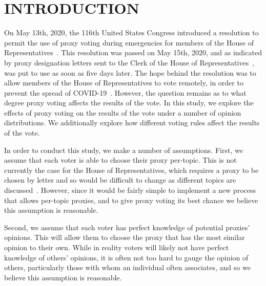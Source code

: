 %
%

\chapter{INTRODUCTION}\label{ch:introduction}
\thispagestyle{empty}

On May 13th, 2020, the 116th United States Congress introduced a resolution
to permit the use of proxy voting during emergencies for members of the House of
Representatives~\cite{Congress.gov2020}.
This resolution was passed on May 15th, 2020, and as indicated by proxy designation
letters sent to the Clerk of the House of Representatives~\cite{Clerk.House.gov2022},
was put to use as soon as five days later.
The hope behind the resolution was to allow members of the House of Representatives
to vote remotely, in order to prevent the spread of COVID-19~\cite{Congress.gov2020}.
However, the question remains as to what degree proxy voting affects the results of
the vote.
In this study, we explore the effects of proxy voting on the results of the vote
under a number of opinion distributions.
We additionally explore how different voting rules affect the results of the vote.


In order to conduct this study, we make a number of assumptions.
First, we assume that each voter is able to choose their proxy per-topic.
This is not currently the case for the House of Representatives, which requires
a proxy to be chosen by letter and so would be difficult to change as different
topics are discussed~\cite{Congress.gov2020}.
However, since it would be fairly simple to implement a new process that allows
per-topic proxies, and to give proxy voting its best chance we believe this assumption
is reasonable.

Second, we assume that each voter has perfect knowledge of potential proxies' opinions.
This will allow them to choose the proxy that has the most similar opinion to their own.
While in reality voters will likely not have perfect knowledge of others' opinions,
it is often not too hard to gauge the opinion of others, particularly those with whom
an individual often associates, and so we believe this assumption is reasonable.

